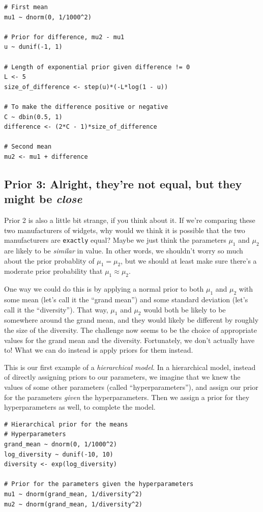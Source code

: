 \begin{verbatim}
# First mean
mu1 ~ dnorm(0, 1/1000^2)

# Prior for difference, mu2 - mu1
u ~ dunif(-1, 1)

# Length of exponential prior given difference != 0
L <- 5
size_of_difference <- step(u)*(-L*log(1 - u))

# To make the difference positive or negative
C ~ dbin(0.5, 1)
difference <- (2*C - 1)*size_of_difference

# Second mean
mu2 <- mu1 + difference
\end{verbatim}

\subsection{Prior 3: Alright, they're not equal, but they might be {\it close}}
Prior 2 is also a little bit strange, if you think about it. If we're comparing
these two manufacturers of widgets, why would we think it is possible that the
two manufacturers are {\tt exactly} equal? Maybe we just think the parameters
$\mu_1$ and $\mu_2$ are likely to be {\it similar} in value.
In other words, we shouldn't worry so much about the
prior probablity of $\mu_1 = \mu_2$, but we should at least make sure there's
a moderate prior probability that $\mu_1 \approx \mu_2$.

One way we could do this is by applying a normal prior to both $\mu_1$ and
$\mu_2$ with some mean (let's call it the ``grand mean'')
and some standard deviation (let's call it the ``diversity'').
That way, $\mu_1$ and
$\mu_2$ would both be likely to be somewhere around the grand mean, and
they would likely be different by roughly the size of the diversity.
The challenge now seems to be the choice of appropriate values for the grand
mean and the diversity. Fortunately, we don't actually have to! What we can
do instead is apply priors for them instead.

This is our first example of a {\it hierarchical model}. In a hierarchical
model, instead of directly assigning priors to our parameters, we imagine that
we knew the values of some other parameters (called ``hyperparameters''), and
assign our prior for the parameters {\it given} the hyperparameters. Then we
assign a prior for they hyperparameters as well, to complete the model.

\begin{verbatim}
# Hierarchical prior for the means
# Hyperparameters
grand_mean ~ dnorm(0, 1/1000^2)
log_diversity ~ dunif(-10, 10)
diversity <- exp(log_diversity)

# Prior for the parameters given the hyperparameters
mu1 ~ dnorm(grand_mean, 1/diversity^2)
mu2 ~ dnorm(grand_mean, 1/diversity^2)
\end{verbatim}

